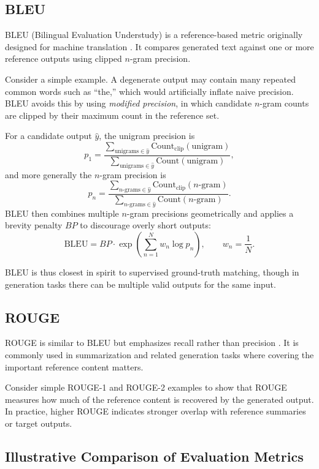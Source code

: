 \documentclass{article}
\begin{document}
\subsection{BLEU}
BLEU (Bilingual Evaluation Understudy) is a reference-based metric originally designed for machine translation \cite{papineni2002bleu}. It compares generated text against one or more reference outputs using clipped $n$-gram precision.

Consider a simple example. A degenerate output may contain many repeated common words such as ``the,'' which would artificially inflate naive precision. BLEU avoids this by using \emph{modified precision}, in which candidate $n$-gram counts are clipped by their maximum count in the reference set.

For a candidate output $\hat{y}$, the unigram precision is
\[
p_1 = \frac{\sum_{\text{unigrams}\in \hat{y}} \mathrm{Count}_{\mathrm{clip}}(\text{unigram})}{\sum_{\text{unigrams}\in \hat{y}} \mathrm{Count}(\text{unigram})},
\]
and more generally the $n$-gram precision is
\[
p_n = \frac{\sum_{n\text{-grams}\in \hat{y}} \mathrm{Count}_{\mathrm{clip}}(n\text{-gram})}{\sum_{n\text{-grams}\in \hat{y}} \mathrm{Count}(n\text{-gram})}.
\]
BLEU then combines multiple $n$-gram precisions geometrically and applies a brevity penalty $BP$ to discourage overly short outputs:
\begin{equation}
\mathrm{BLEU} = BP\cdot \exp\left(\sum_{n=1}^{N} w_n \log p_n\right),
\qquad w_n = \frac{1}{N}.
\end{equation}

BLEU is thus closest in spirit to supervised ground-truth matching, though in generation tasks there can be multiple valid outputs for the same input.

\subsection{ROUGE}
ROUGE is similar to BLEU but emphasizes recall rather than precision \cite{lin2004rouge}. It is commonly used in summarization and related generation tasks where covering the important reference content matters.

Consider simple ROUGE-1 and ROUGE-2 examples to show that ROUGE measures how much of the reference content is recovered by the generated output. In practice, higher ROUGE indicates stronger overlap with reference summaries or target outputs.

\subsection{Illustrative Comparison of Evaluation Metrics}
\end{document}
